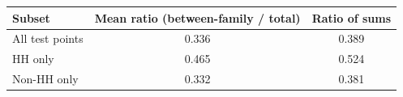 \begin{tabular}{lcc}
\hline
Subset & Mean ratio (between-family / total) & Ratio of sums \\
\hline
All test points & 0.336 & 0.389 \\
HH only & 0.465 & 0.524 \\
Non-HH only & 0.332 & 0.381 \\
\hline
\end{tabular}
